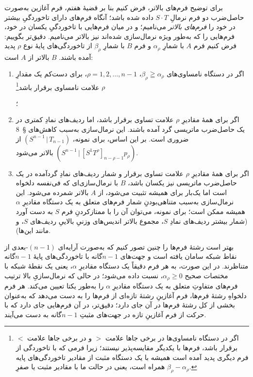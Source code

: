 \documentclass[11pt]{article}
\newcommand{\srcLTR}[1]{\relax\ifmmode\text{\mbox{\babelsublr{\foreignlanguage{english}{#1}}}}\else\babelsublr{\foreignlanguage{english}{#1}}\fi}
\newcommand{\srcfn}[2]{\begingroup\renewcommand{\thefootnote}{\srcLTR{#1}}\footnote{#2}\addtocounter{footnote}{-1}\endgroup}
\providecommand{\pair}[2]{(#1\,|\,#2)}
\begin{document}
برای توضیح فرم‌های بالاتر، فرض کنیم بنا بر قضیهٔ هفتم، فرم آغازین به‌صورت حاصل‌ضرب دو فرم نرمالِ $S\cdot T$ داده شده باشد؛ آنگاه فرم‌های دارای تاخوردگیِ بیشتر در خود را \emph{فرم‌های بالاتر} می‌نامیم؛ و در میان فرم‌هایی با تاخوردگیِ یکسان در خود، فرم‌هایی را که به‌طور ویژه نرمال‌سازی شده‌اند نیز بالاتر می‌نامیم. دقیق‌تر بگوییم: فرض کنیم فرم $A$ با شمارِ $\alpha_\rho$ و فرم $B$ با شمارِ $\beta_\rho$ از تاخوردگی‌های پایهٔ نوع $\rho$ پدید آمده باشند. $B$ بالاتر از $A$ است:
\begin{enumerate}
\renewcommand{\labelenumi}{\arabic{enumi})}
\item اگر در دستگاه نامساوی‌های $\beta_\rho\geqq\alpha_\rho$، $\rho=1,2,\ldots,n-1$، برای دست‌کم یک مقدارِ $\rho$ علامت نامساوی برقرار باشد\srcfn{**)}{اگر در دستگاه نامساوی‌ها در برخی جاها علامت $>$ و در برخی جاها علامت $<$ برقرار باشد، فرم‌ها با یکدیگر مقایسه‌پذیر نیستند؛ زیرا فرمی که با تاخوردگی از فرم دیگری پدید آمده است همیشه با یک دستگاه مثبت از مقادیر تاخوردگی‌های پایه همراه است، یعنی در حالت ما با مقادیر مثبت یا صفرِ $\beta_\rho-\alpha_\rho$.}؛
\item اگر برای همهٔ مقادیرِ $\rho$ علامت تساوی برقرار باشد، اما ردیف‌های نمادِ کمتری در یک حاصل‌ضرب ماتریسی گرد آمده باشند. این نرمال‌سازی به‌سبب کاهش‌های \S\ 8 ضروری است. بر این اساس، برای نمونه، $\pair{S^{n-1}}{T_{n-1}}$ از $\pair{S^{n-1}}{[S^1T^\rho]_{n-\rho-1}p_\rho}$ بالاتر می‌شود.
\item اگر برای همهٔ مقادیرِ $\rho$ علامت تساوی برقرار و شمار ردیف‌های نمادِ گردآمده در یک حاصل‌ضرب ماتریسی نیز یکسان باشد، $B$ با نرمال‌سازی‌ای که فی‌نفسه دلخواه است اما یک‌بار برای همیشه تثبیت می‌شود، از $A$ بالاتر شمرده می‌شود. این نرمال‌سازی به‌سبب متناهی‌بودنِ شمار فرم‌های متعلق به یک دستگاه مقادیرِ $\alpha$ همیشه ممکن است؛ برای نمونه، می‌توان آن را با ممتازکردنِ فرم $S$ به دست آورد (شمار بیشتر ردیف‌های نمادِ $S$، مجموع بالاتر اندیس‌های وزنیِ بالاییِ ردیف‌های $S$، و مانند این‌ها).
\end{enumerate}
بهتر است رشتهٔ فرم‌ها را چنین تصور کنیم که به‌صورت آرایه‌ای $(n-1)$-بعدی از نقاط شبکه سامان یافته است و جهت‌های $n-1$گانه با تاخوردگی‌های پایهٔ $n-1$گانه متناظرند. در این صورت، به هر فرم دقیقاً یک دستگاه مقادیرِ $\alpha$، یعنی یک نقطهٔ شبکه با مختصات صحیح $\alpha_\rho\ge0$، نسبت داده می‌شود؛ در حالی که نرمال‌سازیِ بالا ترتیب فرم‌های متفاوتِ متعلق به یک دستگاه مقادیرِ $\alpha$ را به‌طور یکتا تعیین می‌کند. هر فرم دلخواهِ رشتهٔ فرم‌ها، فرم آغازینِ رشتهٔ تازه‌ای از فرم‌ها را به دست می‌دهد که به‌عنوان بخشی از کل رشتهٔ فرم‌ها در آن جای دارد؛ دقیق‌تر، در آن فرم‌هایی جای دارد که با حرکت از فرم آغازینِ تازه در جهت‌های مثبتِ $n-1$گانه به دست می‌آیند.
\end{document}
